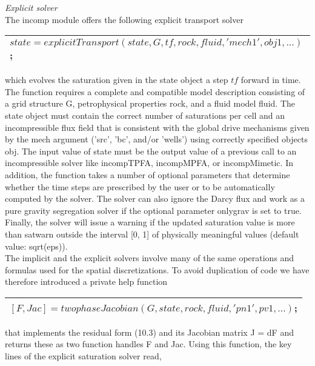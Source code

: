 \documentclass[a4paper,10pt]{report}
\begin{document}
\emph{Explicit solver}\\
The incomp module offers the following explicit transport solver
\begin{table}[!ht]
\centering
\begin{tabular}{ |l |} 
\hline
$state = explicitTransport(state, G, tf, rock, fluid, 'mech1', obj1, ...)$;\\
 \hline
\end{tabular}
\label{table:etransp}
\end{table} 

which evolves the saturation given in the state object a step $tf$ forward
in time. The function requires a complete and compatible model description
consisting of a grid structure G, petrophysical properties rock, and a fluid
model fluid. The state object must contain
the correct number of saturations per cell and an incompressible flux field that
is consistent with the global drive mechanisms given by the mech argument
(’src’, ’bc’, and/or ’wells’) using correctly specified objects obj. The input value of state
must be the output value of a previous call to an incompressible solver like
incompTPFA, incompMPFA, or incompMimetic. In addition, the function takes
a number of optional parameters that determine whether the time steps are
prescribed by the user or to be automatically computed by the solver. The
solver can also ignore the Darcy flux and work as a pure gravity segregation
solver if the optional parameter onlygrav is set to true. Finally, the solver will
issue a warning if the updated saturation value is more than satwarn outside
the interval [0, 1] of physically meaningful values (default value: sqrt(eps)).\\
The implicit and the explicit solvers involve many of the same operations
and formulas used for the spatial discretizations. To avoid duplication of code
we have therefore introduced a private help function
\begin{table}[!ht]
\centering
\begin{tabular}{ |l |} 
\hline
$[F,Jac] = twophaseJacobian(G, state, rock, fluid, 'pn1', pv1, ...)$;\\
 \hline
\end{tabular}
\label{table:twophaseJacobian}
\end{table} 
that implements the residual form (10.3) and its Jacobian matrix J = dF and
returns these as two function handles F and Jac. Using this function, the key
lines of the explicit saturation solver read,
\end{document}
